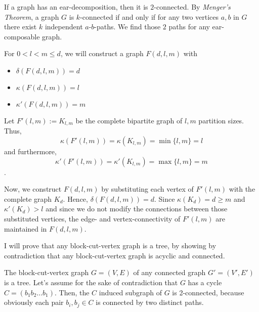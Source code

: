 \documentclass[a4paper]{article}
\begin{document}
	\begin{solution}{13}
		\begin{theorem}{If a graph has an ear-decomposition, then it is $2$-connected.}
			By \emph{Menger's Theorem}, a graph $G$ is $k$-connected if and only if for any two vertices $a, b$ in $G$ there exist $k$ independent $a$-$b$-paths. We find those $2$ paths for any ear-composable graph.
		\end{theorem}
	\end{solution}
	\newpage
	\begin{solution}{14}
		For $0 < l < m \leq d$, we will construct a graph $F(d, l, m)$ with 
		\begin{itemize}
			\item $\delta(F(d,l,m)) = d$
			\item $\kappa(F(d,l,m)) = l$
			\item $\kappa'(F(d,l,m)) = m$
		\end{itemize}
		Let $F'( l, m) := K_{l, m}$ be the complete bipartite graph of $l, m$ partition sizes. Thus,
			\begin{equation}
				\kappa(F'(l, m)) = \kappa(K_{l, m}) = \min\{l, m\} = l
			\end{equation}
		and furthermore, 
			\begin{equation}
				\kappa'(F'(l, m)) = \kappa'(K_{l, m}) = \max\{l, m\} = m
			\end{equation}
		.

		Now, we construct  $F(d, l, m)$ by substituting each vertex of $F'(l, m)$ with the complete graph $K_{d}$. Hence, $\delta(F(d,l,m)) = d$. Since $\kappa(K_{d}) = d \geq m$ and $\kappa'(K_{d}) > l$ and since we do not modify the connections between those substituted vertices, the edge- and vertex-connectivity of $F'(l, m)$ are maintained in $F(d, l, m)$.
	\end{solution}
	\newpage
	\begin{solution}{15}
		I will prove that any block-cut-vertex graph is a tree, by showing by contradiction that any block-cut-vertex graph is acyclic and connected. 
		\begin{theorem}{The block-cut-vertex graph $G=(V,E)$ of any connected graph $G'=(V',E')$ is a tree.}
		Let's assume for the sake of contradiction that $G$ has a cycle $C=(b_1b_2...b_1)$. 
		Then, the $C$ induced subgraph of $G$ is 2-connected, because obviously each pair $b_i,b_j \in C$ is connected by two distinct paths. 
		
		
		\end{theorem}
	\end{solution}
	\newpage
	\begin{solution}{16}
	\end{solution}
	
\end{document}
